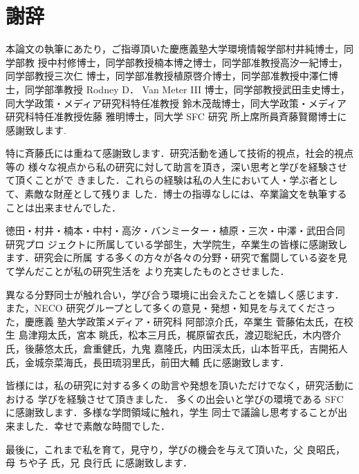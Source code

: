 \chapter*{謝辞}
\label{thanks}

本論文の執筆にあたり，ご指導頂いた慶應義塾大学環境情報学部村井純博士，同学部教
授中村修博士，同学部教授楠本博之博士，同学部准教授高汐一紀博士，同学部教授三次仁
博士，同学部准教授植原啓介博士，同学部准教授中澤仁博士，同学部準教授 Rodney D．
Van Meter III 博士，同学部教授武田圭史博士，同大学政策・メディア研究科特任准教授
鈴木茂哉博士，同大学政策・メディア研究科特任准教授佐藤 雅明博士，同大学 SFC 研究
所上席所員斉藤賢爾博士に感謝致します.

特に斉藤氏には重ねて感謝致します．研究活動を通して技術的視点，社会的視点等の
様々な視点から私の研究に対して助言を頂き，深い思考と学びを経験させて頂くことがで
きました．これらの経験は私の人生において人・学ぶ者として、素敵な財産として残りま
した．博士の指導なしには、卒業論文を執筆することは出来ませんでした．

徳田・村井・楠本・中村・高汐・バンミーター・植原・三次・中澤・武田合同研究プロ
ジェクトに所属している学部生，大学院生，卒業生の皆様に感謝致します．研究会に所属
する多くの方々が各々の分野・研究で奮闘している姿を見て学んだことが私の研究生活を
より充実したものとさせました．

異なる分野同士が触れ合い，学び合う環境に出会えたことを嬉しく感じます．
また，NECO 研究グループとして多くの意見・発想・知見を与えてくださった，慶應義
塾大学政策メディア・研究科 阿部涼介氏，卒業生 菅藤佑太氏，在校生 島津翔太氏，宮本
眺氏，松本三月氏，梶原留衣氏，渡辺聡紀氏，木内啓介氏，後藤悠太氏，倉重健氏，九鬼
嘉隆氏，内田渓太氏，山本哲平氏，吉開拓人氏，金城奈菜海氏，長田琉羽里氏，前田大輔
氏に感謝致します．

皆様には，私の研究に対する多くの助言や発想を頂いただけでなく，研究活動における
学びを経験させて頂きました．
多くの出会いと学びの環境である SFC に感謝致します．多様な学問領域に触れ，学生
同士で議論し思考することが出来ました．幸せで素敵な時間でした．

最後に，これまで私を育て，見守り，学びの機会を与えて頂いた，父 良昭氏，母 ちや子
氏，兄 良行氏 に感謝致します．



